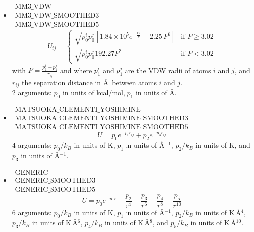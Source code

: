 \begin{itemize}
\item{$\begin{array}{l}\text{MM3\_VDW}\\
      \text{MM3\_VDW\_SMOOTHED3}\\
      \text{MM3\_VDW\_SMOOTHED5}\end{array}$}\\
  \begin{equation}
    U_{ij}= \begin{cases}
       \sqrt{p_0^i p_0^j}\left[1.84\times10^5 e^{-\frac{12}{P}}-2.25\,P^6\right] & \text{if }P\geq 3.02\\
       \sqrt{p_0^i p_0^j} 192.27 P^2  & \text{if }P<3.02
       \end{cases}
  \end{equation}
  with $P=\frac{p_1^i+p_1^j}{r_{ij}}$ and where $p_1^i$ and $p_1^j$ are the VDW radii of atoms $i$ and $j$,
  and $r_{ij}$ the separation distance in \AA\ between atoms $i$ and $j$. \\
  2 arguments: $p_0$ in units of kcal/mol, $p_1$ in units of \AA.

\item{$\begin{array}{l}\text{MATSUOKA\_CLEMENTI\_YOSHIMINE}\\
      \text{MATSUOKA\_CLEMENTI\_YOSHIMINE\_SMOOTHED3}\\
      \text{MATSUOKA\_CLEMENTI\_YOSHIMINE\_SMOOTHED5}\end{array}$}\\
  \begin{equation}
    U= p_0e^{-p_1 r_{ij}}+p_2e^{-p_3 r_{ij}}
  \end{equation}
   4 arguments: $p_0/k_B$ in units of K, $p_1$ in units of \AA$^{-1}$, $p_2/k_B$ in units of K, and $p_3$ in units of \AA$^{-1}$.

\item{$\begin{array}{l}\text{GENERIC}\\
      \text{GENERIC\_SMOOTHED3}\\
      \text{GENERIC\_SMOOTHED5}\end{array}$}\\
  \begin{equation}
    U= p_0 e^{-p_1 r}-\frac{p_2}{r^4}-\frac{p_3}{r^6}-\frac{p_4}{r^8}-\frac{p_5}{r^{10}}
  \end{equation}
  6 arguments: $p_0/k_B$ in units of K, $p_1$ in units of \AA$^{-1}$, $p_2/k_B$ in units of K\,\AA$^{4}$, $p_3/k_B$ in units of K\,\AA$^{6}$,
  $p_4/k_B$ in units of K\,\AA$^{8}$, and $p_5/k_B$ in units of K\,\AA$^{10}$.


\end{itemize}
